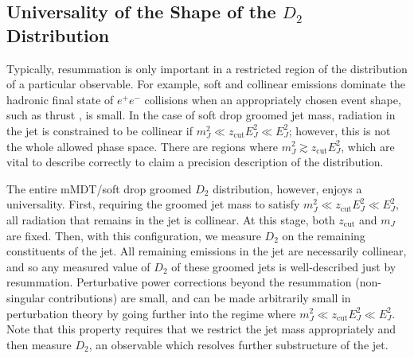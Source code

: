 \documentclass[a4paper,11pt]{article}
\def\zcut{z_{\text{cut}}}
\begin{document}
\subsection{Universality of the Shape of the $D_2$ Distribution}


Typically, resummation is only important in a restricted region of the distribution of a particular observable.  For example, soft and collinear emissions dominate the hadronic final state of $e^+e^-$ collisions when an appropriately chosen event shape, such as thrust \cite{Farhi:1977sg}, is small.  In the case of soft drop groomed jet mass, radiation in the jet is constrained to be collinear if $ m_J^2 \ll \zcut E_J^2\ll E_J^2$; however, this is not the whole allowed phase space.  There are regions where $ m_J^2 \gtrsim \zcut E_J^2$, which are vital to describe correctly to claim a precision description of the distribution.

The entire mMDT/soft drop groomed $D_2$ distribution, however, enjoys a universality.  First, requiring the groomed jet mass to satisfy $ m_J^2 \ll \zcut E_J^2\ll E_J^2$, all radiation that remains in the jet is collinear.  At this stage, both $\zcut$ and $m_J$ are fixed.  Then, with this configuration, we measure $D_2$ on the remaining constituents of the jet.  All remaining emissions in the jet are necessarily collinear, and so any measured value of $D_2$ of these groomed jets is well-described just by resummation.  Perturbative power corrections beyond the resummation (non-singular contributions) are small, and can be made arbitrarily small in perturbation theory by going further into the regime where $ m_J^2 \ll \zcut E_J^2\ll E_J^2$.  Note that this property requires that we restrict the jet mass appropriately and then measure $D_2$, an observable which resolves further substructure of the jet.
\end{document}
